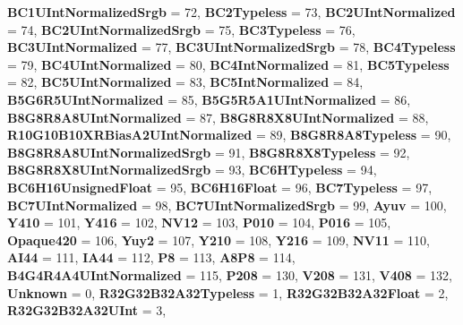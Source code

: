 \begin{DoxyCompactItemize}
{\bfseries B\+C1\+U\+Int\+Normalized\+Srgb} = 72, 
\newline
{\bfseries B\+C2\+Typeless} = 73, 
{\bfseries B\+C2\+U\+Int\+Normalized} = 74, 
{\bfseries B\+C2\+U\+Int\+Normalized\+Srgb} = 75, 
{\bfseries B\+C3\+Typeless} = 76, 
\newline
{\bfseries B\+C3\+U\+Int\+Normalized} = 77, 
{\bfseries B\+C3\+U\+Int\+Normalized\+Srgb} = 78, 
{\bfseries B\+C4\+Typeless} = 79, 
{\bfseries B\+C4\+U\+Int\+Normalized} = 80, 
\newline
{\bfseries B\+C4\+Int\+Normalized} = 81, 
{\bfseries B\+C5\+Typeless} = 82, 
{\bfseries B\+C5\+U\+Int\+Normalized} = 83, 
{\bfseries B\+C5\+Int\+Normalized} = 84, 
\newline
{\bfseries B5\+G6\+R5\+U\+Int\+Normalized} = 85, 
{\bfseries B5\+G5\+R5\+A1\+U\+Int\+Normalized} = 86, 
{\bfseries B8\+G8\+R8\+A8\+U\+Int\+Normalized} = 87, 
{\bfseries B8\+G8\+R8\+X8\+U\+Int\+Normalized} = 88, 
\newline
{\bfseries R10\+G10\+B10\+X\+R\+Bias\+A2\+U\+Int\+Normalized} = 89, 
{\bfseries B8\+G8\+R8\+A8\+Typeless} = 90, 
{\bfseries B8\+G8\+R8\+A8\+U\+Int\+Normalized\+Srgb} = 91, 
{\bfseries B8\+G8\+R8\+X8\+Typeless} = 92, 
\newline
{\bfseries B8\+G8\+R8\+X8\+U\+Int\+Normalized\+Srgb} = 93, 
{\bfseries B\+C6\+H\+Typeless} = 94, 
{\bfseries B\+C6\+H16\+Unsigned\+Float} = 95, 
{\bfseries B\+C6\+H16\+Float} = 96, 
\newline
{\bfseries B\+C7\+Typeless} = 97, 
{\bfseries B\+C7\+U\+Int\+Normalized} = 98, 
{\bfseries B\+C7\+U\+Int\+Normalized\+Srgb} = 99, 
{\bfseries Ayuv} = 100, 
\newline
{\bfseries Y410} = 101, 
{\bfseries Y416} = 102, 
{\bfseries N\+V12} = 103, 
{\bfseries P010} = 104, 
\newline
{\bfseries P016} = 105, 
{\bfseries Opaque420} = 106, 
{\bfseries Yuy2} = 107, 
{\bfseries Y210} = 108, 
\newline
{\bfseries Y216} = 109, 
{\bfseries N\+V11} = 110, 
{\bfseries A\+I44} = 111, 
{\bfseries I\+A44} = 112, 
\newline
{\bfseries P8} = 113, 
{\bfseries A8\+P8} = 114, 
{\bfseries B4\+G4\+R4\+A4\+U\+Int\+Normalized} = 115, 
{\bfseries P208} = 130, 
\newline
{\bfseries V208} = 131, 
{\bfseries V408} = 132, 
{\bfseries Unknown} = 0, 
{\bfseries R32\+G32\+B32\+A32\+Typeless} = 1, 
\newline
{\bfseries R32\+G32\+B32\+A32\+Float} = 2, 
{\bfseries R32\+G32\+B32\+A32\+U\+Int} = 3, 

\end{DoxyCompactItemize}
